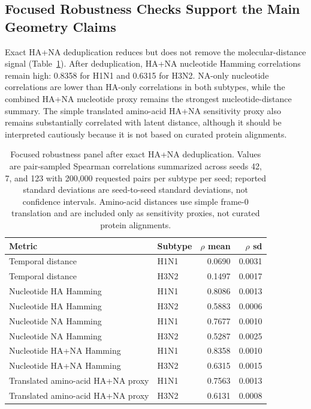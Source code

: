\documentclass[11pt]{article}
\begin{document}
\subsection{Focused Robustness Checks Support the Main Geometry Claims}

Exact HA+NA deduplication reduces but does not remove the molecular-distance signal (Table~\ref{tab:robust-spearman}). After deduplication, HA+NA nucleotide Hamming correlations remain high: 0.8358 for H1N1 and 0.6315 for H3N2. NA-only nucleotide correlations are lower than HA-only correlations in both subtypes, while the combined HA+NA nucleotide proxy remains the strongest nucleotide-distance summary. The simple translated amino-acid HA+NA sensitivity proxy also remains substantially correlated with latent distance, although it should be interpreted cautiously because it is not based on curated protein alignments.

\begin{table}[H]
\centering
\caption{Focused robustness panel after exact HA+NA deduplication. Values are pair-sampled Spearman correlations summarized across seeds 42, 7, and 123 with 200,000 requested pairs per subtype per seed; reported standard deviations are seed-to-seed standard deviations, not confidence intervals. Amino-acid distances use simple frame-0 translation and are included only as sensitivity proxies, not curated protein alignments.}
\label{tab:robust-spearman}
\begin{tabular}{llrr}
\toprule
Metric & Subtype & $\rho$ mean & $\rho$ sd \\
\midrule
Temporal distance & H1N1 & 0.0690 & 0.0031 \\
Temporal distance & H3N2 & 0.1497 & 0.0017 \\
Nucleotide HA Hamming & H1N1 & 0.8086 & 0.0013 \\
Nucleotide HA Hamming & H3N2 & 0.5883 & 0.0006 \\
Nucleotide NA Hamming & H1N1 & 0.7677 & 0.0010 \\
Nucleotide NA Hamming & H3N2 & 0.5287 & 0.0025 \\
Nucleotide HA+NA Hamming & H1N1 & 0.8358 & 0.0010 \\
Nucleotide HA+NA Hamming & H3N2 & 0.6315 & 0.0015 \\
Translated amino-acid HA+NA proxy & H1N1 & 0.7563 & 0.0013 \\
Translated amino-acid HA+NA proxy & H3N2 & 0.6131 & 0.0008 \\
\bottomrule
\end{tabular}
\end{table}
\end{document}
